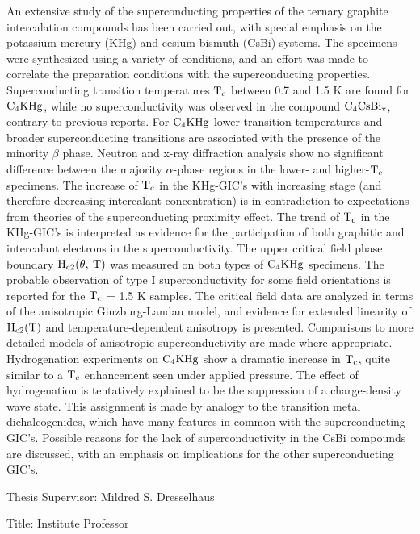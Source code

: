 An  extensive study  of   the  superconducting properties  of  the  ternary
graphite   intercalation   compounds has   been  carried out,  with special
emphasis on the potassium-mercury (KHg) and cesium-bismuth  (CsBi) systems.
The specimens were synthesized using a variety of conditions, and an effort
was  made to correlate the  preparation conditions with the superconducting
properties.  Superconducting transition temperatures  $\rm T_c$ between 0.7
and  1.5 K  are found  for   $\rm  C_4KHg$, while  no superconductivity was
observed in  the compound $\rm C_4CsBi_{x}$,  contrary to previous reports.
For $\rm C_4KHg$  lower transition temperatures and broader superconducting
transitions are associated with the presence of the minority $\beta$ phase.
Neutron and  x-ray  diffraction analysis  show no  significant   difference
between the majority $\alpha$-phase regions  in the lower-  and higher-$\rm
T_c$ specimens.  The increase of $\rm T_c$ in the KHg-GIC's with increasing
stage  (and  therefore    decreasing    intercalant  concentration)  is  in
contradiction  to  expectations   from  theories  of    the superconducting
proximity effect.  The  trend of $\rm T_c$  in the KHg-GIC's is interpreted
as evidence  for   the participation of  both graphitic   and   intercalant
electrons in  the  superconductivity.  The   upper   critical field   phase
boundary $\rm H_{c2}(\theta,  \: T)$ was   measured on  both  types of $\rm
C_4KHg$ specimens.  The  probable observation  of type I  superconductivity
for some field orientations is reported for the $\rm T_c$ = 1.5  K samples.
The  critical field  data  are   analyzed in  terms   of  the   anisotropic
Ginzburg-Landau   model,  and  evidence for  extended  linearity  of   $\rm
H_{c2}(T)$ and temperature-dependent anisotropy  is presented.  Comparisons
to more detailed  models  of anisotropic superconductivity  are  made where
appropriate.   Hydrogenation  experiments on $\rm  C_4KHg$ show  a dramatic
increase in $\rm T_c$, quite similar to a  $\rm T_c$ enhancement seen under
applied pressure.  The effect of hydrogenation is  tentatively explained to
be the suppression of a charge-density wave state.  This assignment is made
by  analogy  to  the transition   metal dichalcogenides, which  have   many
features in  common with the  superconducting GIC's.  Possible  reasons for
the lack of superconductivity in the CsBi compounds  are discussed, with an
emphasis on implications for the other superconducting GIC's.

\begin{list}{}{\setlength{\rightmargin}{\leftmargin}}
\item[Thesis Supervisor:]  Mildred S. Dresselhaus
\item[Title:] Institute Professor
\end{list}
